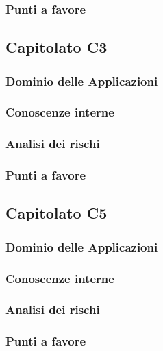   
  
  \subsubsection{Punti a favore}
  
  
  
  
\subsection{Capitolato C3}
  \subsubsection{Dominio delle Applicazioni}
  \subsubsection{Conoscenze interne}
  \subsubsection{Analisi dei rischi}
  \subsubsection{Punti a favore}
\subsection{Capitolato C5}
  \subsubsection{Dominio delle Applicazioni}
  \subsubsection{Conoscenze interne}
  \subsubsection{Analisi dei rischi}
  \subsubsection{Punti a favore}